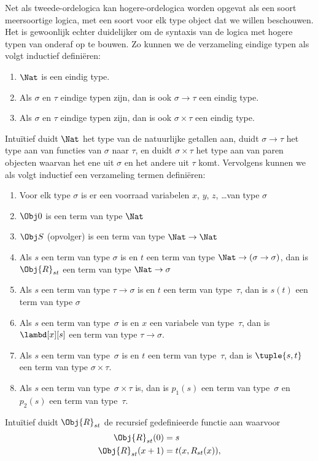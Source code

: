 \documentclass[../../../include/open-logic-section]{subfiles}
\begin{document}
Net als tweede-ordelogica kan hogere-ordelogica worden opgevat als een soort
meersoortige logica, met een soort voor elk type object dat we willen
beschouwen. Het is gewoonlijk echter duidelijker om de syntaxis van de logica
met hogere typen van onderaf op te bouwen. Zo kunnen we de verzameling eindige
typen als volgt inductief definiëren:
\begin{enumerate}
\item $\Nat$ is een eindig type.
\item Als $\sigma$ en $\tau$ eindige typen zijn, dan is ook $\sigma
  \to \tau$ een eindig type.
\item Als $\sigma$ en $\tau$ eindige typen zijn, dan is ook $\sigma \times
  \tau$ een eindig type.
\end{enumerate}
Intuïtief duidt $\Nat$ het type van de natuurlijke getallen aan, duidt
$\sigma \to \tau$ het type aan van functies van $\sigma$ naar $\tau$, en
duidt $\sigma \times \tau$ het type aan van paren objecten waarvan het ene uit
$\sigma$ en het andere uit $\tau$ komt. Vervolgens kunnen we als volgt
inductief een verzameling termen definiëren:
\begin{enumerate}
\item Voor elk type $\sigma$ is er een voorraad variabelen $x$, $y$,
  $z$, \dots van type $\sigma$
\item $\Obj 0$ is een term van type $\Nat$
\item $\Obj S$ (opvolger) is een term van type $\Nat \to \Nat$
\item Als $s$ een term van type $\sigma$ is en $t$ een term van type
  $\Nat \to (\sigma \to \sigma)$, dan is $\Obj{R}_{st}$ een term van type
  $\Nat \to \sigma$
\item Als $s$ een term van type $\tau \to \sigma$ is en $t$ een
  term van type~$\tau$, dan is $s(t)$ een term van type $\sigma$
\item Als $s$ een term van type~$\sigma$ is en $x$ een variabele van
  type~$\tau$, dan is $\lambd[x][s]$ een term van type $\tau \to \sigma$.
\item Als $s$ een term van type~$\sigma$ is en $t$ een term van
  type~$\tau$, dan is $\tuple{s, t}$ een term van type $\sigma \times
  \tau$.
\item Als $s$ een term van type~$\sigma \times \tau$ is, dan is $p_1(s)$ een
  term van type~$\sigma$ en $p_2(s)$ een term van type~$\tau$.
\end{enumerate}
Intuïtief duidt $\Obj{R}_{st}$ de recursief gedefinieerde functie aan waarvoor
\begin{align*}
\Obj{R}_{st}(0) & = s \\
\Obj{R}_{st}(x+1) & = t(x, R_{st}(x)),
\end{align*}
\end{document}
